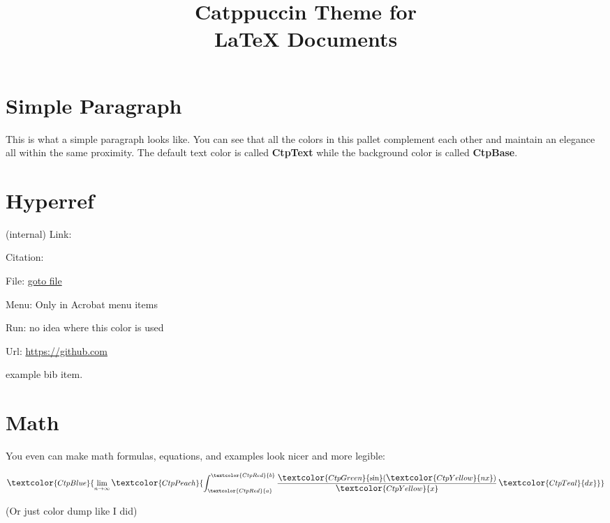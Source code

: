 \documentclass[12pt,a4paper]{article}
\title{ \Huge \textbf{\textcolor{CtpPink}{Catppuccin Theme for} \\ \textcolor{CtpLavender}{\LaTeX{} Documents}} \vspace{-3em}}
\date{}
\begin{document}
\maketitle

\section{\textcolor{CtpSky}{Simple Paragraph}}
\textcolor{CtpYellow}{This is what a simple paragraph looks like.} You can see that all the colors in this pallet complement each other and maintain an elegance all within the same proximity. The default text color is called \textbf{\textcolor{CtpGreen}{CtpText}} while the background color is called \textbf{\textcolor{CtpGreen}{CtpBase}}.
\\

\begin{minipage}{0.47\linewidth}
	\section{\textcolor{CtpSky}{Hyperref}}
	(internal) Link: \pageref{l}

	Citation: \cite{bb}

	File: \href{file:///home/second_user}{goto file}

	Menu: Only in Acrobat menu items

	Run: no idea where this color is used

	Url: \url{https://github.com}

	\label{l}
	\begin{thebibliography}{2}
		 example bib item.
	\end{thebibliography}
\end{minipage}
\hfill\vline\hfill
\begin{minipage}{0.47\linewidth}
	\section{\textcolor{CtpSky}{Math}}

	You even can make math formulas, equations, and examples look nicer and more legible:


	\[\large{
		\textcolor{CtpBlue}{\lim_{{n \to \infty}} \textcolor{CtpPeach}{\int_{\textcolor{CtpRed}{a}}^{\textcolor{CtpRed}{b}} \frac{\textcolor{CtpGreen}{\sin}(\textcolor{CtpYellow}{nx})}{\textcolor{CtpYellow}{x}} \, \textcolor{CtpTeal}{dx}}}
	}\]

	\tiny{(Or just color dump like I did)}
\end{minipage}
\\
\end{document}
